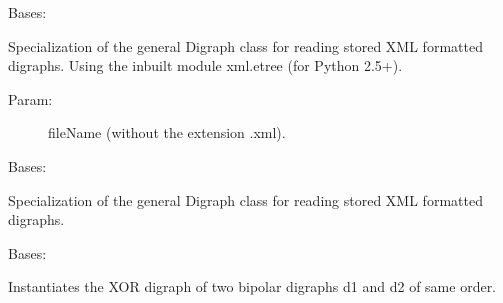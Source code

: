 \documentclass[letterpaper,10pt,english]{sphinxmanual}
\begin{document}
\begin{fulllineitems}
\label{techDoc:digraphs.XMLDigraph}
Bases: {\hyperref[techDoc:digraphs.Digraph]{\emph{}}}

Specialization of the general Digraph class for reading
stored XML formatted digraphs. Using the inbuilt module
xml.etree (for Python 2.5+).
\begin{description}
\item[{Param:}] \leavevmode
fileName (without the extension .xml).

\end{description}

\end{fulllineitems}


\begin{fulllineitems}
\label{techDoc:digraphs.XMLDigraph24}
Bases: {\hyperref[techDoc:digraphs.Digraph]{\emph{}}}

Specialization of the general Digraph class for reading
stored XML formatted digraphs.

\begin{fulllineitems}
\label{techDoc:digraphs.XMLDigraph24.showAll}
\end{fulllineitems}


\end{fulllineitems}


\begin{fulllineitems}
\label{techDoc:digraphs.XORDigraph}
Bases: {\hyperref[techDoc:digraphs.Digraph]{\emph{}}}

Instantiates the XOR digraph of two bipolar
digraphs d1 and d2 of same order.

\end{fulllineitems}


\begin{fulllineitems}
\label{techDoc:digraphs.all_perms}
\end{fulllineitems}
\end{document}
